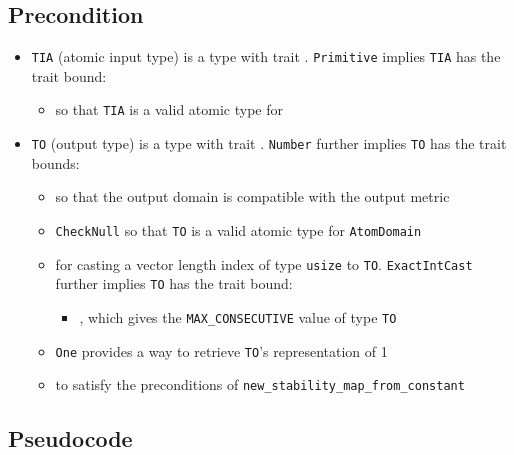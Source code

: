 \documentclass{article}
\begin{document}
\subsection*{Precondition}
\begin{itemize}

    \item \texttt{TIA} (atomic input type) is a type with trait . \texttt{Primitive} implies \texttt{TIA} has the trait bound:
    \begin{itemize}
        \item {} so that \texttt{TIA} is a valid atomic type for 
    \end{itemize}

    \item \texttt{TO} (output type) is a type with trait . \texttt{Number} further implies \texttt{TO} has the trait bounds:
    \begin{itemize}
        \item {} so that the output domain is compatible with the output metric
        \item \texttt{CheckNull} so that \texttt{TO} is a valid atomic type for \texttt{AtomDomain}
        \item {} for casting a vector length index of type \texttt{usize} to \texttt{TO}. \texttt{ExactIntCast} further implies \texttt{TO} has the trait bound:
        \begin{itemize}
            \item {}, which gives the \texttt{MAX\_CONSECUTIVE} value of type \texttt{TO}
        \end{itemize}
        
        \item \texttt{One} provides a way to retrieve \texttt{TO}'s representation of 1
        \item {} to satisfy the preconditions of \texttt{new\_stability\_map\_from\_constant}
    \end{itemize}
\end{itemize}

\subsection*{Pseudocode}

\end{document}
